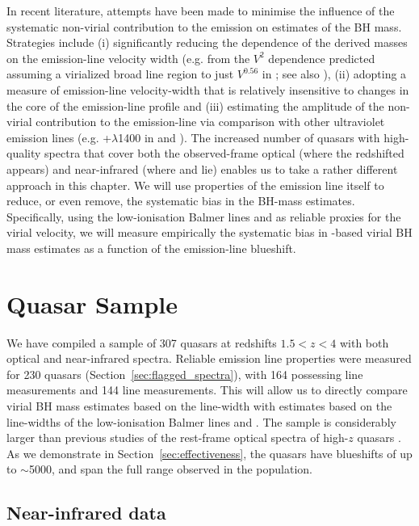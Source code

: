 In recent literature, attempts have been made to minimise the influence of the systematic non-virial contribution to the  emission on estimates of the BH mass. 
Strategies include (i) significantly reducing the dependence of the derived masses on the emission-line velocity width (e.g. from the $V^2$ dependence predicted assuming a virialized broad line region to just $V^{0.56}$ in \citealt{park13}; see also \citealt{shen12}), (ii) adopting a measure of emission-line velocity-width that is relatively insensitive to changes in the core of the emission-line profile \citep[e.g.][]{denney13} and (iii) estimating the amplitude of the non-virial contribution to the  emission-line via comparison with other ultraviolet emission lines (e.g. +$\lambda$1400 in \citealt{runnoe13} and \citealt{brotherton15}).
The increased number of quasars with high-quality spectra that cover both the observed-frame optical (where the redshifted  appears) and near-infrared (where \hb and \ha lie) enables us to take a rather different approach in this chapter.
We will use properties of the  emission line itself to reduce, or even remove, the systematic bias in the BH-mass estimates. 
Specifically, using the low-ionisation Balmer lines \ha and \hb as reliable proxies for the virial velocity, we will measure empirically the systematic bias in -based virial BH mass estimates as a function of the  emission-line blueshift.

\section{Quasar Sample}

We have compiled a sample of 307 quasars at redshifts $1.5 < z < 4$ with both optical and near-infrared spectra.  
Reliable emission line properties were measured for 230 quasars (Section~\ref{sec:flagged_spectra}), with 164 possessing \ha line measurements and 144 \hb line measurements.  
This will allow us to directly compare virial BH mass estimates based on the  line-width with estimates based on the line-widths of the low-ionisation Balmer lines \ha and \hbns.  
The sample is considerably larger than previous studies of the rest-frame optical spectra of high-$z$ quasars \citep[e.g.][]{shen12}. 
As we demonstrate in Section~\ref{sec:effectiveness}, the quasars have  blueshifts of up to $\sim$5000\kms, and span the full range observed in the population. 

\subsection{Near-infrared data}

